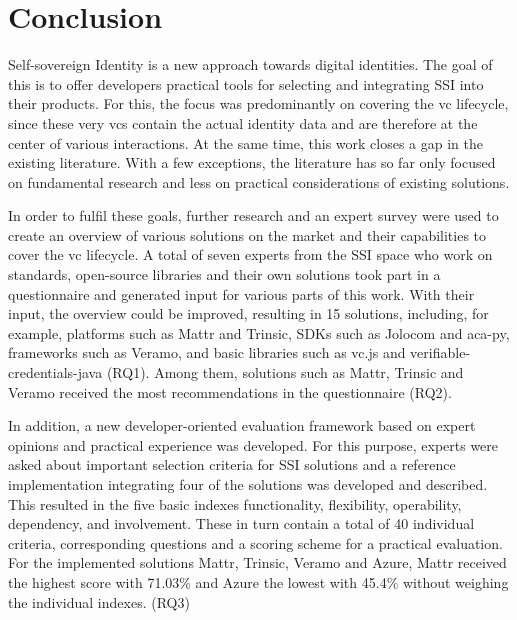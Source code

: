 \chapter{Conclusion}


Self-sovereign Identity is a new approach towards digital identities. The goal of this is to offer developers practical tools for selecting and integrating \ac{SSI} into their products. For this, the focus was predominantly on covering the \ac{vc} lifecycle, since these very \acp{vc} contain the actual identity data and are therefore at the center of various interactions. At the same time, this work closes a gap in the existing literature. With a few exceptions, the literature has so far only focused on fundamental research and less on practical considerations of existing solutions.

In order to fulfil these goals, further research and an expert survey were used to create an overview of various solutions on the market and their capabilities to cover the \ac{vc} lifecycle. A total of seven experts from the \ac{SSI} space who work on standards, open-source libraries and their own solutions took part in a questionnaire and generated input for various parts of this work. With their input, the overview could be improved, resulting in 15 solutions, including, for example, platforms such as Mattr and Trinsic, SDKs such as Jolocom and aca-py, frameworks such as Veramo, and basic libraries such as vc.js and verifiable-credentials-java (RQ1). Among them, solutions such as Mattr, Trinsic and Veramo received the most recommendations in the questionnaire (RQ2).

In addition, a new developer-oriented evaluation framework based on expert opinions and practical experience was developed. For this purpose, experts were asked about important selection criteria for \ac{SSI} solutions and a reference implementation integrating four of the solutions was developed and described. This resulted in the five basic indexes functionality, flexibility, operability, dependency, and involvement. These in turn contain a total of 40 individual criteria, corresponding questions and a scoring scheme for a practical evaluation. For the implemented solutions Mattr, Trinsic, Veramo and Azure, Mattr received the highest score with 71.03\% and Azure the lowest with 45.4\% without weighing the individual indexes. (RQ3)

